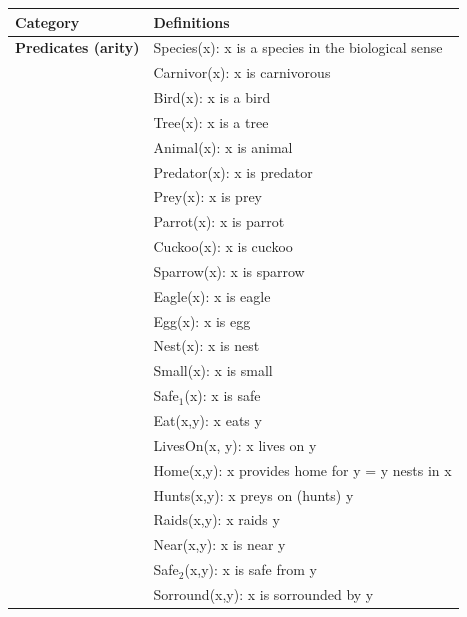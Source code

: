 \documentclass[11pt,a4paper]{article}
\newenvironment{solution}{%
    \begin{tcolorbox}[
        breakable,
        colback=green!4,
        colframe=green!50!black,
        fonttitle=\bfseries,
        title={ Solution},
        left=6pt, right=6pt, top=4pt, bottom=4pt
    ]%
    }{%
    \end{tcolorbox}%
}
\begin{document}
    \begin{solution}
        \begin{center}
            \renewcommand{\arraystretch}{1.4}
            \begin{tabular}{>{\bfseries}p{3.5cm} p{9cm}}
                \toprule
                Category & Definitions \\
                \midrule
                Predicates (arity)
                & Species(x): x is a species in the biological sense \\
                & Carnivor(x): x is carnivorous \\
                & Bird(x): x is a bird \\
                & Tree(x): x is a tree \\
                & Animal(x): x is animal \\
                & Predator(x): x is predator \\
                & Prey(x): x is prey \\
                & Parrot(x): x is parrot \\
                & Cuckoo(x): x is cuckoo \\
                & Sparrow(x): x is sparrow \\
                & Eagle(x): x is eagle \\
                & Egg(x): x is egg \\
                & Nest(x): x is nest \\

                & Small(x): x is small \\
                & Safe$_1$(x): x is safe \\

                & Eat(x,y): x eats y \\
                & LivesOn(x, y): x lives on y  \\
                & Home(x,y): x provides home for y = y nests in x \\
                & Hunts(x,y): x preys on (hunts) y \\
                & Raids(x,y): x raids y \\

                & Near(x,y): x is near y \\
                & Safe$_2$(x,y): x is safe from y \\
                & Sorround(x,y): x is sorrounded by y  \\


\end{tabular}
\end{center}
\end{solution}
\end{document}
